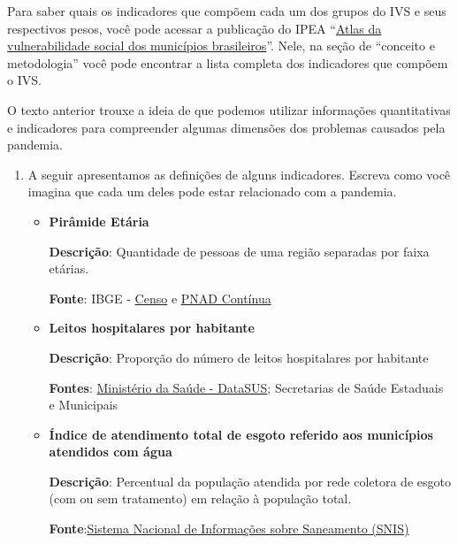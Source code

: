 Para saber quais os indicadores que compõem cada um dos grupos do IVS e seus respectivos pesos, você pode acessar a publicação do IPEA “\href{http://ivs.ipea.gov.br/images/publicacoes/Ivs/publicacao_atlas_ivs.pdf}{Atlas da vulnerabilidade social dos municípios brasileiros}”. Nele, na seção de “conceito e metodologia” você pode encontrar a lista completa dos indicadores que compõem o IVS.

\begin{task}{}

O texto anterior trouxe a ideia de que podemos utilizar informações quantitativas e indicadores para compreender algumas dimensões dos problemas causados pela pandemia.

\begin{enumerate}
\item A seguir apresentamos as definições de alguns indicadores. Escreva como você imagina que cada um deles pode estar relacionado com a pandemia.

\begin{itemize}[itemsep=1em]
\setlength\parskip{-2pt}
\item \textbf{Pirâmide Etária}

\textbf{Descrição}: Quantidade de pessoas de uma região separadas por faixa etárias.

\textbf{Fonte}: IBGE - \href{https://www.ibge.gov.br/estatisticas/sociais/populacao/25089-censo-1991-6.html?=&t=o-que-e}{Censo} e \href{https://www.ibge.gov.br/estatisticas/sociais/populacao/9173-pesquisa-nacional-por-amostra-de-domicilios-continua-trimestral.html?t=destaques}{PNAD Contínua}

\item \textbf{Leitos hospitalares por habitante}

\textbf{Descrição}: Proporção do número de leitos hospitalares por habitante

\textbf{Fontes}: \href{https://datasus.saude.gov.br/}{Ministério da Saúde - DataSUS}; Secretarias de Saúde Estaduais e Municipais

\item \textbf{Índice de atendimento total de esgoto referido aos municípios atendidos com água}

\textbf{Descrição}: Percentual da população atendida por rede coletora de esgoto (com ou sem tratamento) em relação à população total.

\textbf{Fonte}:\href{http://www.snis.gov.br/painel-informacoes-saneamento-brasil/web/painel-setor-saneamento}{Sistema Nacional de Informações sobre Saneamento (SNIS)}



\end{itemize}
\end{enumerate}
\end{task}
